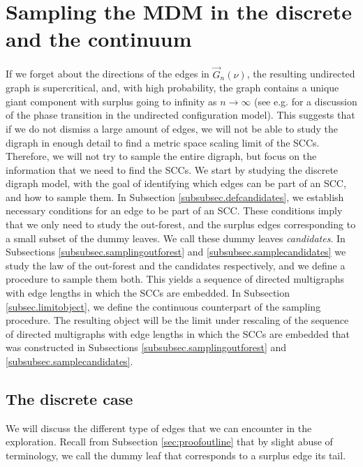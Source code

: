 \section{Sampling the MDM in the discrete and the continuum}
If we forget about the directions of the edges in $\vec{G}_n(\nu)$, the resulting undirected graph is supercritical, and, with high probability, the graph contains a unique giant component with surplus going to infinity as $n\to \infty$ (see e.g. \cite{molloyCriticalPointRandom1995,Molloy1998,Janson2009} for a discussion of the phase transition in the undirected configuration model). This suggests that if we do not dismiss a large amount of edges, we will not be able to study the digraph in enough detail to find a metric space scaling limit of the SCCs. Therefore, we will not try to sample the entire digraph, but focus on the information that we need to find the SCCs. We start by studying the discrete digraph model, with the goal of identifying which edges can be part of an SCC, and how to sample them. In Subsection \ref{subsubsec.defcandidates}, we establish necessary conditions for an edge to be part of an SCC. These conditions imply that we only need to study the out-forest, and the surplus edges corresponding to a small subset of the dummy leaves. We call these dummy leaves \emph{candidates}. In Subsections \ref{subsubsec.samplingoutforest} and \ref{subsubsec.samplecandidates} we study the law of the out-forest and the candidates respectively, and we define a procedure to sample them both. This yields a sequence of directed multigraphs with edge lengths in which the SCCs are embedded.  
In Subsection \ref{subsec.limitobject}, we define the continuous counterpart of the sampling procedure. The resulting object will be the limit under rescaling of the sequence of directed multigraphs with edge lengths in which the SCCs are embedded that was constructed in Subsections \ref{subsubsec.samplingoutforest} and \ref{subsubsec.samplecandidates}. 
\subsection{The discrete case}\label{subsec.discrete}
We will discuss the different type of edges that we can encounter in the exploration. Recall from Subsection \ref{sec:proofoutline} that by slight abuse of terminology, we call the dummy leaf that corresponds to a surplus edge its tail.

